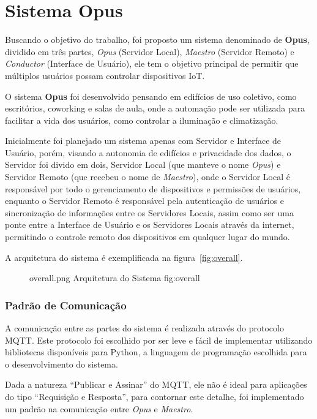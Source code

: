 \chapter{Sistema Opus}
\label{sistema}

Buscando o objetivo do trabalho, foi proposto um sistema denominado de \textbf{Opus}, dividido em três partes, 
\emph{Opus} (Servidor Local), \emph{Maestro} (Servidor Remoto) e \emph{Conductor} (Interface de Usuário), 
ele tem o objetivo principal de permitir que múltiplos usuários possam controlar dispositivos IoT.

O sistema \textbf{Opus} foi desenvolvido pensando em edifícios de uso coletivo, como escritórios, coworking e
salas de aula, onde a automação pode ser utilizada para facilitar a vida dos usuários, como controlar a iluminação e
climatização. 

Inicialmente foi planejado um sistema apenas com Servidor e Interface de Usuário, porém, visando a autonomia de edifícios e
privacidade dos dados, o Servidor foi divido em dois, Servidor Local (que manteve o nome \emph{Opus}) e Servidor Remoto (que recebeu o nome de 
\emph{Maestro}), onde o Servidor Local é responsável por todo o gerenciamento de dispositivos e permissões de usuários, 
enquanto o Servidor Remoto é responsável pela autenticação de usuários e sincronização de informações entre os Servidores Locais,
assim como ser uma ponte entre a Interface de Usuário e os Servidores Locais através da internet, permitindo o controle remoto
dos dispositivos em qualquer lugar do mundo.

A arquitetura do sistema é exemplificada na figura~\ref{fig:overall}.

\begin{figure}[h!]
    {overall.png}
    {Arquitetura do Sistema}
    {fig:overall}
\end{figure}


\subsection{Padrão de Comunicação}
\label{sec:opus-comunicacao}
A comunicação entre as partes do sistema é realizada através do protocolo MQTT.
Este protocolo foi escolhido por ser leve e fácil de implementar utilizando bibliotecas disponíveis para Python,
a linguagem de programação escolhida para o desenvolvimento do sistema. 

Dada a natureza ``Publicar e Assinar'' do MQTT,
ele não é ideal para aplicações do tipo ``Requisição e Resposta'', para contornar este detalhe, foi implementado um padrão na comunicação entre
\emph{Opus} e \emph{Maestro}.

